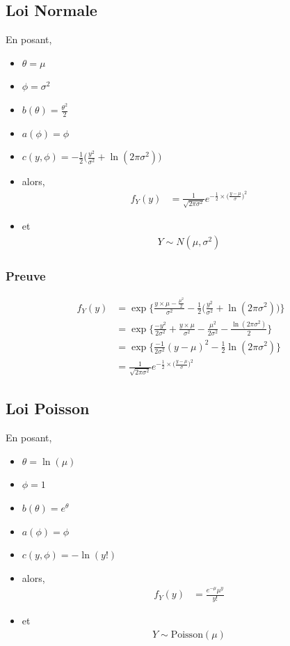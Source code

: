 \documentclass[11pt,french]{report}
\newcommand{\fact}[1]{#1\mathpunct{}!}
\begin{document}
\subsection{Loi Normale}
En posant,
\begin{itemize}
     \item $\theta = \mu$
     \item $\phi = \sigma^2$
     \item $b(\theta) = \frac{\theta^2}{2}$
     \item $a(\phi) = \phi$
     \item $c(y, \phi) = -\frac{1}{2}\bigg(\frac{y^2}{\sigma^2} + \ln(2 \pi \sigma^2) \bigg)$
     \item[] alors,
     \begin{align*}
          f_Y(y) &= \frac{1}{\sqrt{2 \pi \sigma^2}}e^{-\frac{1}{2}\times \big(\frac{y - \mu}{\sigma} \big)^2}
     \end{align*}
     \item[] et
     \begin{align*}
          Y \sim N(\mu, \sigma^2)
     \end{align*}
\end{itemize}

\subsubsection*{Preuve}
\begin{align*}
f_Y(y) &= \exp\Bigg\lbrace \frac{y \times \mu - \frac{\mu^2}{2}}{\sigma^2} -\frac{1}{2} \bigg( \frac{y^2}{\sigma^2} + \ln(2 \pi \sigma^2) \bigg) \Bigg\rbrace \\
&= \exp\Bigg\lbrace \frac{-y^2}{2\sigma^2} + \frac{y \times \mu}{\sigma^2} - \frac{\mu^2}{2\sigma^2} - \frac{\ln(2 \pi \sigma^2)}{2} \Bigg\rbrace \\
&= \exp\Bigg\lbrace \frac{-1}{2\sigma^2}(y - \mu)^2 - \frac{1}{2} \ln(2\pi \sigma^2)\Bigg\rbrace \\
&= \frac{1}{\sqrt{2 \pi \sigma^2}}e^{-\frac{1}{2}\times \big(\frac{y - \mu}{\sigma} \big)^2}
\end{align*}

\subsection{Loi Poisson}
En posant,
\begin{itemize}
     \item $\theta = \ln(\mu)$
     \item $\phi = 1$
     \item $b(\theta) = e^{\theta}$
     \item $a(\phi) = \phi$
     \item $c(y, \phi) = -\ln(\fact{y})$
     \item[] alors,
     \begin{align*}
          f_Y(y) &= \frac{e^{-\mu}\mu^y}{\fact{y}}
     \end{align*}
     \item[] et
     \begin{align*}
          Y \sim \text{Poisson}(\mu)
     \end{align*}
\end{itemize}
\end{document}
